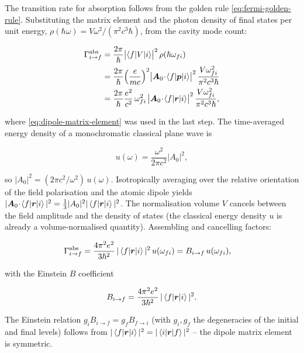 The transition rate for absorption follows from the golden rule \eqref{eq:fermi-golden-rule}. Substituting the matrix element and the photon density of final states per unit energy, $\rho(\hbar\omega) = V\omega^{2}/(\pi^{2}c^{3}\hbar)$, from the cavity mode count:
\begin{linenomath}
\begin{align*}
\Gamma_{i\to f}^{\text{abs}}
&= \frac{2\pi}{\hbar}\bigl|\braket{f|V|i}\bigr|^{2}\,\rho(\hbar\omega_{fi}) \\
&= \frac{2\pi}{\hbar}\Bigl(\frac{e}{mc}\Bigr)^{2}
   \bigl|\bm A_{0}\!\cdot\!\braket{f|\bm p|i}\bigr|^{2}\,
   \frac{V\omega_{fi}^{2}}{\pi^{2}c^{3}\hbar} \\
&= \frac{2\pi}{\hbar}\frac{e^{2}}{c^{2}}\,
   \omega_{fi}^{2}\,\bigl|\bm A_{0}\!\cdot\!\braket{f|\bm r|i}\bigr|^{2}\,
   \frac{V\omega_{fi}^{2}}{\pi^{2}c^{3}\hbar},
\end{align*}
\end{linenomath}
where \eqref{eq:dipole-matrix-element} was used in the last step.
The time-averaged energy density of a monochromatic classical plane wave is
\begin{linenomath}
\begin{equation}
u(\omega) = \frac{\omega^{2}}{2\pi c^{2}}|A_{0}|^{2},
\label{eq:classical-energy-density}
\end{equation}
\end{linenomath}
so $|A_{0}|^{2} = (2\pi c^{2}/\omega^{2})\,u(\omega)$. Isotropically averaging over the relative orientation of the field polarisation and the atomic dipole yields $|\bm A_{0}\!\cdot\!\braket{f|\bm r|i}|^{2} = \frac13|A_{0}|^{2}|\braket{f|\bm r|i}|^{2}$. The normalisation volume $V$ cancels between the field amplitude and the density of states (the classical energy density $u$ is already a volume-normalised quantity). Assembling and cancelling factors:
\begin{linenomath}
\begin{align*}
\Gamma_{i\to f}^{\text{abs}}
&= \frac{4\pi^{2}e^{2}}{3\hbar^{2}}\,|\braket{f|\bm r|i}|^{2}\,u(\omega_{fi})
   = B_{i\to f}\,u(\omega_{fi}),
\end{align*}
\end{linenomath}
with the Einstein $B$ coefficient
\begin{linenomath}
\begin{equation}
B_{i\to f} = \frac{4\pi^{2}e^{2}}{3\hbar^{2}}\,|\braket{f|\bm r|i}|^{2}.
\label{eq:einstein-B}
\end{equation}
\end{linenomath}
The Einstein relation $g_{i}B_{i\to f} = g_{f}B_{f\to i}$ (with $g_{i},g_{f}$ the degeneracies of the initial and final levels) follows from $|\braket{f|\bm r|i}|^{2} = |\braket{i|\bm r|f}|^{2}$ -- the dipole matrix element is symmetric.

